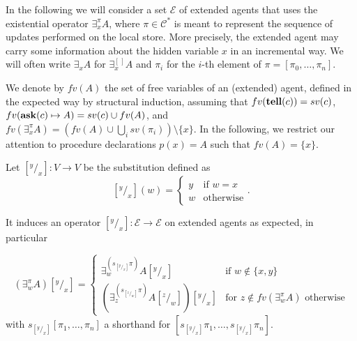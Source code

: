 \documentclass{llncs}
\newcommand{\tell}{{\bf tell}}
\newcommand{\ask}{{\bf ask}}
\newcommand{\ostop}{{\bf stop}}
\newcommand{\rarrow}{\rightarrow}
\begin{document}
In the following we will consider 
a set $\mathcal{E}$ of extended agents that uses the existential operator $\exists^{\pi}_x A$, 
where $\pi \in {\mathcal C}^\ast$ is meant to represent the sequence of updates performed on the local store. 
More precisely, the extended agent may carry some information about the hidden variable 
$x$ in an incremental way. We will often write $\exists_x A$ for $\exists^{[ \,]}_x A$ and $\pi_i$ for 
the $i$-th element of $\pi = [ \pi_0, \ldots, \pi_n]$.

We denote by $fv(A)$ the set of free variables of an (extended) agent, defined in the expected way 
by structural induction, assuming that $fv(\tell(c)) = sv(c)$,
$fv(\ask(c) \mapsto A) = sv(c) \cup fv(A)$,
and $fv(\exists^{\pi}_x A) = (fv(A) \cup \bigcup_i sv(\pi_i)) \setminus \{x\}$.
%
In the following, we restrict our attention to 
procedure declarations $p(x) = A$ such that $fv(A) = \{x\}$.


\begin{definition}[Substitutions]
Let $[^y/_x]: V \to V$ be the substitution defined as
\[ [^y/_x](w) = 
		\begin{cases} 
			y & \text{if $w = x$} \\
            w & \text{otherwise}
        \end{cases}. \]

It induces an operator $[^y/_x]: \mathcal{E} \rarrow \mathcal{E}$ on extended agents as expected,  in particular

        $$(\exists^{\pi}_w A)[^y/_x] = \begin{cases} 
			\exists^{(s_{[^y/_x]} \pi)}_w A[^y/_x]  & \text{if } w \not \in \{x, y\} \\
             (\exists^{(s_{[^z/_w]} \pi)}_z A[^z/_w])[^y/_x] & \text{for } z \not \in fv(\exists^{\pi}_w A) \text{ otherwise}
        \end{cases}$$
with $s_{[^y/_x]} [ \pi_1, \ldots, \pi_n ]$ a shorthand for $[s_{[^y/_x]} \pi_1, \ldots, s_{[^y/_x]} \pi_n]$.
\end{definition}
\end{document}
